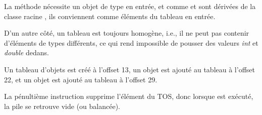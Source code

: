 La méthode  nécessite un objet de type  en entrée, et comme
 et  sont dérivées de la classe racine , ils conviennent
comme éléments du tableau en entrée.

D'un autre côté, un tableau est toujours homogène, i.e., il ne peut pas contenir
d'éléments de types différents, ce qui rend impossible de pousser des valeurs \emph{int}
et \emph{double} dedans.

Un tableau d'objets  est créé à l'offset 13, un objet  est
ajouté au tableau à l'offset 22, et un objet  est ajouté au tableau à
l'offset 29.

La pénultième instruction  supprime l'élément du \ac{TOS}, donc lorsque
 est exécuté, la pile se retrouve vide (ou balancée).

